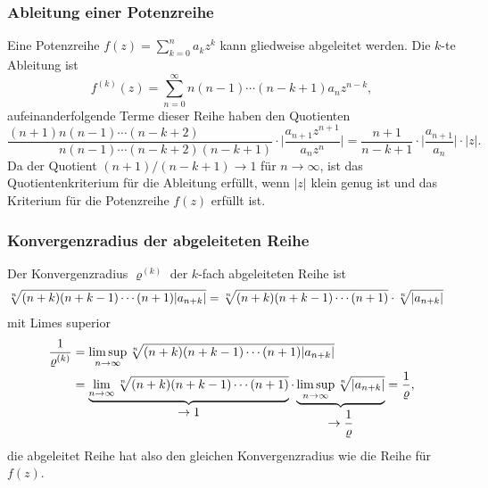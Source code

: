 \subsubsection{Ableitung einer Potenzreihe}
Eine Potenzreihe
$f(z)=\sum_{k=0}^n a_kz^k$
kann gliedweise abgeleitet werden.
Die $k$-te Ableitung ist
\[
f^{(k)}(z)
=
\sum_{n=0}^\infty n(n-1)\cdots(n-k+1) a_nz^{n-k},
\]
aufeinanderfolgende Terme dieser Reihe haben den Quotienten
\[
\frac{
(n+1)n(n-1)\cdots(n-k+2)\phantom{(n-k+1)}
}{
\phantom{(n+1)}n(n-1)\cdots(n-k+2)(n-k+1)
}
\cdot
\biggl|
\frac{a_{n+1}z^{n+1}}{a_nz^n}
\biggr|
=
\frac{n+1}{n-k+1}
\cdot
\biggl|
\frac{a_{n+1}}{a_n}
\biggr|
\cdot|z|.
\]
Da der Quotient $(n+1)/(n-k+1)\to 1$ für $n\to\infty$, ist das
Quotientenkriterium für die Ableitung erfüllt, wenn $|z|$ klein genug ist
und das Kriterium für die Potenzreihe $f(z)$ erfüllt ist.

\subsubsection{Konvergenzradius der abgeleiteten Reihe}
Der Konvergenzradius $\varrho^{(k)}$ der $k$-fach abgeleiteten Reihe ist
\begin{align*}
\root{n}\of{\mathstrut(n+k)(n+k-1)\cdots(n+1) |a_{n+k}|}
&=
\root{n}\of{\mathstrut(n+k)(n+k-1)\cdots(n+1)}
\cdot
\root{n}\of{|a_{n+k}|}
\end{align*}
mit Limes superior
\begin{align*}
\frac{1}{\varrho^{(k)}}
&=
\limsup_{n\to\infty}
\root{n}\of{\mathstrut(n+k)(n+k-1)\cdots(n+1) |a_{n+k}|}
\\
&=
\underbrace{
\lim_{n\to\infty}
\root{n}\of{\mathstrut(n+k)(n+k-1)\cdots(n+1)}
}_{\displaystyle\to 1}
\cdot
\underbrace{
\limsup_{n\to\infty}
\root{n}\of{\mathstrut|a_{n+k}|}
}_{\displaystyle\to\frac{1}{\varrho}}
=
\frac{1}{\varrho},
\end{align*}
die abgeleitet Reihe hat also den gleichen Konvergenzradius wie die
Reihe für $f(z)$.

